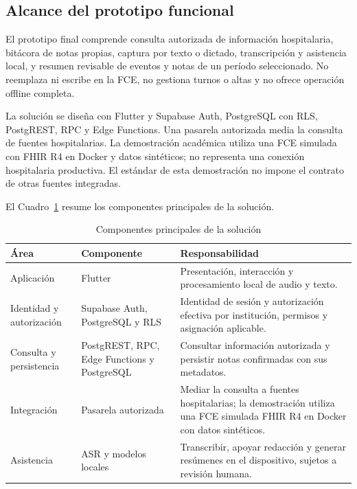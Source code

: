 \subsection{Alcance del prototipo funcional}

El prototipo final comprende consulta autorizada de información hospitalaria, bitácora de notas propias, captura por texto o dictado, transcripción y asistencia local, y resumen revisable de eventos y notas de un período seleccionado. No reemplaza ni escribe en la FCE, no gestiona turnos o altas y no ofrece operación offline completa.

La solución se diseña con Flutter y Supabase Auth, PostgreSQL con RLS, PostgREST, RPC y Edge Functions. Una pasarela autorizada media la consulta de fuentes hospitalarias. La demostración académica utiliza una FCE simulada con FHIR R4 en Docker y datos sintéticos; no representa una conexión hospitalaria productiva. El estándar de esta demostración no impone el contrato de otras fuentes integradas.

El Cuadro~\ref{tab:infraestructura_implementada} resume los componentes principales de la solución.

\begin{table}[H]
    \caption{Componentes principales de la solución}
    \label{tab:infraestructura_implementada}
    \begin{tabularx}{\textwidth}{|l|X|X|}
        \hline
        \textbf{Área} & \textbf{Componente} & \textbf{Responsabilidad} \\
        \hline
        Aplicación & Flutter & Presentación, interacción y procesamiento local de audio y texto. \\
        \hline
        Identidad y autorización & Supabase Auth, PostgreSQL y RLS & Identidad de sesión y autorización efectiva por institución, permisos y asignación aplicable. \\
        \hline
        Consulta y persistencia & PostgREST, RPC, Edge Functions y PostgreSQL & Consultar información autorizada y persistir notas confirmadas con sus metadatos. \\
        \hline
        Integración & Pasarela autorizada & Mediar la consulta a fuentes hospitalarias; la demostración utiliza una FCE simulada FHIR R4 en Docker con datos sintéticos. \\
        \hline
        Asistencia & ASR y modelos locales & Transcribir, apoyar redacción y generar resúmenes en el dispositivo, sujetos a revisión humana. \\
        \hline
    \end{tabularx}
\end{table}

